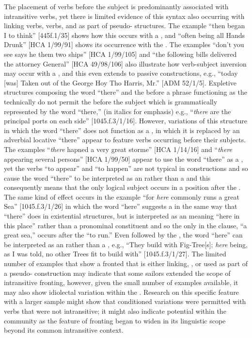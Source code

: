 The placement of verbs before the subject is predominantly associated with intransitive verbs, yet there is limited evidence of this syntax also occurring with linking verbs,  verbs, and as part of pseudo- structures. The example “then began I to think” [445f.1/35] shows how this occurs with a , and “often being all Hands Drunk” [HCA 1/99/91] shows its occurrence with the . The examples “don’t you see says he them two ships” [HCA 1/99/105] and “the following bills delivered the attorney General” [HCA 49/98/106] also illustrate how verb-subject inversion may occur with a , and this even extends to passive constructions, e.g., “today [was] Taken out of the George Hoy Tho Harris, Mr.” [ADM 52/1/5]. Expletive structures composing the word “there” and the  before a  phrase functioning as the  technically do not permit the  before the subject which is grammatically represented by the word “there,” (in italics for emphasis) e.g., “\textit{there}\textbf{ }are the principal ports on each side” [1045.f.3/1/16]. However, variations of this structure in which the word “there” does not function as a , in which it is replaced by an adverbial locative “there” appear to feature verbs occurring before their  subjects. The examples “\textit{there} hapned a very great storme” [HCA 1/14/16] and “\textit{there} appearing several persons” [HCA 1/99/50] appear to use the word “there” as a , yet the verbs “to appear” and “to happen” are not typical in  constructions and so cause the word “there” to be interpreted as an  rather than a  and this consequently means that the only logical  subject occurs in a position after the .  The same kind of effect occurs in the example “for \textit{here} commonly runs a great Sea” [1045.f.3/1/26] in which the word “here” suggests a  in the same way that “there” does in existential structures, but is interpreted as an  meaning “here in this place” rather than a pronominal constituent and so the only  in the clause, “a great sea,” occurs after the  “to run.” Even followed by the , the word “here” can be interpreted as an  rather than a , e.g., “They build with Fig-Tree[s]; \textit{here} being, as I was told, no other Trees fit to build with” [1045.f.3/1/27]. The limited number of examples that show a fronted  that is either linking, , or used as part of a pseudo- construction may indicate that some sailors extended the scope of intransitive  fronting, however, given the small number of examples available, it may also show idiolectal variation within the .  Research on this specific feature with a larger sample might show that conditioned variations were permitted with verbs that were not intransitive; it might also indicate potential  within the community as the feature of  fronting began to widen in its linguistic scope beyond its common intransitive context. 

